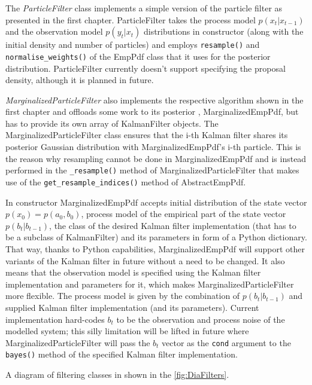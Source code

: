 The \emph{ParticleFilter} class implements a simple version of the particle filter as presented in
the first chapter. ParticleFilter takes the process model \(p(x_t|x_{t-1})\) and the observation
model \(p(y_t|x_t)\) distributions in constructor (along with the initial density and number of
particles) and employs \verb|resample()| and \verb|normalise_weights()| of the EmpPdf class that it
uses for the posterior distribution. ParticleFilter currently doesn't support specifying the
proposal density, although it is planned in future.

\emph{MarginalizedParticleFilter} also implements the respective algorithm shown in the first
chapter and offloads some work to its posterior {\pdf}, MarginalizedEmpPdf, but has to provide its
own array of KalmanFilter objects. The MarginalizedParticleFilter class ensures that the i-th Kalman
filter shares its posterior Gaussian distribution with MarginalizedEmpPdf's i-th particle. This is
the reason why resampling cannot be done in MarginalizedEmpPdf and is instead performed in the
\verb|_resample()| method of MarginalizedParticleFilter that makes use of the
\verb|get_resample_indices()| method of AbstractEmpPdf.

In constructor MarginalizedEmpPdf accepts initial distribution of the state vector
\(p(x_0) = p(a_0, b_0)\), process model of the empirical part of the state vector \(p(b_t|b_{t-1})\),
the class of the desired Kalman filter implementation (that has to be a subclass of KalmanFilter)
and its parameters in form of a Python dictionary. That way, thanks to Python capabilities,
MarginalizedEmpPdf will support other variants of the Kalman filter in future without a need to be
changed. It also means that the observation model is specified using the Kalman filter implementation
and parameters for it, which makes MarginalizedParticleFilter more flexible. The process model is
given by the combination of \(p(b_t|b_{t-1})\) and supplied Kalman filter implementation (and its
parameters). Current implementation hard-codes \(b_t\) to be the observation and process noise of
the modelled system; this silly limitation will be lifted in future where MarginalizedParticleFilter
will pass the \(b_t\) vector as the \verb|cond| argument to the \verb|bayes()| method of the
specified Kalman filter implementation.

A diagram of filtering classes in shown in the \autoref{fig:DiaFilters}.

